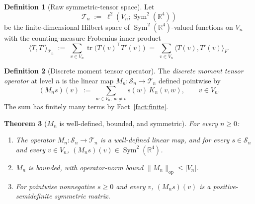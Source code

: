 \documentclass[11pt, a4paper]{amsart}
\newtheorem{theorem}{Theorem}[section]
\theoremstyle{definition}
\newtheorem{definition}[theorem]{Definition}
\newcommand{\R}{\mathbb{R}}
\newcommand{\tr}{\operatorname{tr}}
\newcommand{\op}{\operatorname{op}}
\newcommand{\Sym}{\operatorname{Sym}}
\begin{document}
\begin{definition}[Raw symmetric-tensor space]
\label{def:tn}
Let
\[
  \mathcal T_n \;:=\; \ell^2(V_n; \Sym^2(\R^4))
\]
be the finite-dimensional Hilbert space of $\Sym^2(\R^4)$-valued
functions on $V_n$ with the counting-measure Frobenius inner
product
\[
  \langle T, T' \rangle_{\mathcal T_n}
    \;:=\; \sum_{v \in V_n} \tr\bigl(T(v)^\top T'(v)\bigr)
    \;=\; \sum_{v \in V_n} \langle T(v), T'(v)
    \rangle_F.
\]
\end{definition}

\begin{definition}[Discrete moment tensor operator]
\label{def:mn}
The \emph{discrete moment tensor operator} at level $n$ is the
linear map $M_n \colon \mathcal S_n \to \mathcal T_n$ defined
pointwise by
\[
  (M_n s)(v) \;:=\; \sum_{w \in V_n,\ w \neq v} s(w)\,K_n(v, w),
  \qquad v \in V_n.
\]
The sum has finitely many terms by Fact~\ref{fact:finite}.
\end{definition}

\begin{theorem}[$M_n$ is well-defined, bounded, and symmetric]
\label{thm:mn-welldef}
For every $n \geq 0$:
\begin{enumerate}
\item[\textup{(i)}] The operator $M_n \colon \mathcal S_n \to
  \mathcal T_n$ is a well-defined linear map, and for every
  $s \in \mathcal S_n$ and every $v \in V_n$, $(M_n s)(v) \in
  \Sym^2(\R^4)$.
\item[\textup{(ii)}] $M_n$ is bounded, with operator-norm bound
  $\|M_n\|_\op \leq |V_n|$.
\item[\textup{(iii)}] For pointwise nonnegative $s \geq 0$ and
  every $v$, $(M_n s)(v)$ is a positive-semidefinite symmetric
  matrix.
\end{enumerate}
\end{theorem}
\end{document}
